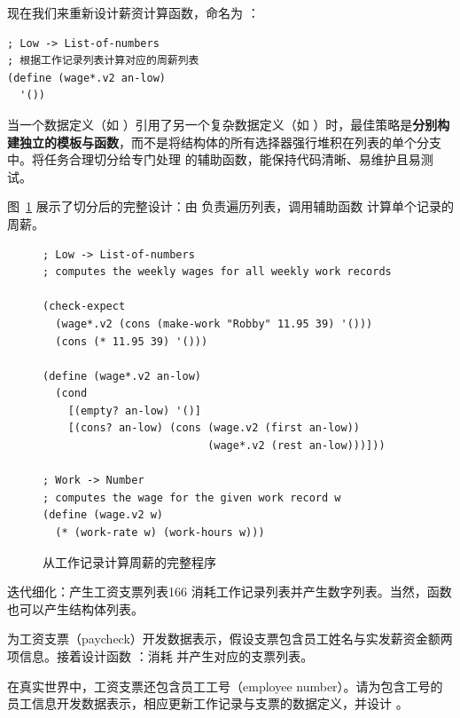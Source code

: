 现在我们来重新设计薪资计算函数，命名为 ：
\begin{lstlisting}[language=BSL]
; Low -> List-of-numbers
; 根据工作记录列表计算对应的周薪列表
(define (wage*.v2 an-low)
  '())
\end{lstlisting}

\begin{notebox}
当一个数据定义（如 ）引用了另一个复杂数据定义（如 ）时，最佳策略是\textbf{分别构建独立的模板与函数}，而不是将结构体的所有选择器强行堆积在列表的单个分支中。将任务合理切分给专门处理  的辅助函数，能保持代码清晰、易维护且易测试。
\end{notebox}

图~\ref{fig:computing_wages_from_work_records} 展示了切分后的完整设计：由  负责遍历列表，调用辅助函数  计算单个记录的周薪。

\begin{figure}[htbp]
  \centering
\begin{lstlisting}[language=BSL, basicstyle=\scriptsize\ttfamily]
; Low -> List-of-numbers
; computes the weekly wages for all weekly work records

(check-expect
  (wage*.v2 (cons (make-work "Robby" 11.95 39) '()))
  (cons (* 11.95 39) '()))

(define (wage*.v2 an-low)
  (cond
    [(empty? an-low) '()]
    [(cons? an-low) (cons (wage.v2 (first an-low))
                          (wage*.v2 (rest an-low)))]))

; Work -> Number
; computes the wage for the given work record w
(define (wage.v2 w)
  (* (work-rate w) (work-hours w)))
\end{lstlisting}
  \caption{从工作记录计算周薪的完整程序}
  \label{fig:computing_wages_from_work_records}
\end{figure}

\begin{exercise}{迭代细化：产生工资支票列表}{166}
 消耗工作记录列表并产生数字列表。当然，函数也可以产生结构体列表。

为工资支票（paycheck）开发数据表示，假设支票包含员工姓名与实发薪资金额两项信息。接着设计函数 ：消耗  并产生对应的支票列表。

在真实世界中，工资支票还包含员工工号（employee number）。请为包含工号的员工信息开发数据表示，相应更新工作记录与支票的数据定义，并设计 。
\end{exercise}

